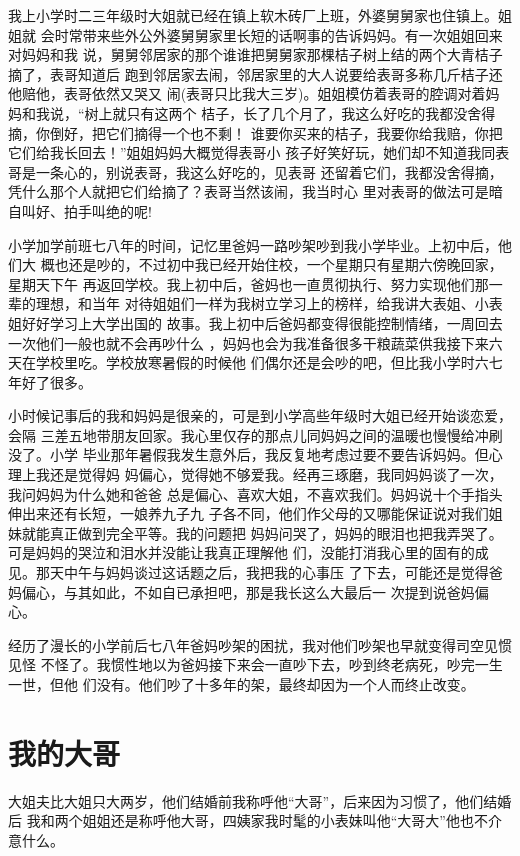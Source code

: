 \documentclass[12pt]{book}
\begin{document}
我上小学时二三年级时大姐就已经在镇上软木砖厂上班，外婆舅舅家也住镇上。姐姐就
会时常带来些外公外婆舅舅家里长短的话啊事的告诉妈妈。有一次姐姐回来对妈妈和我
说，舅舅邻居家的那个谁谁把舅舅家那棵桔子树上结的两个大青桔子摘了，表哥知道后
跑到邻居家去闹，邻居家里的大人说要给表哥多称几斤桔子还他赔他，表哥依然又哭又
闹(表哥只比我大三岁)。姐姐模仿着表哥的腔调对着妈妈和我说，“树上就只有这两个
桔子，长了几个月了，我这么好吃的我都没舍得摘，你倒好，把它们摘得一个也不剩！
谁要你买来的桔子，我要你给我赔，你把它们给我长回去！”姐姐妈妈大概觉得表哥小
孩子好笑好玩，她们却不知道我同表哥是一条心的，别说表哥，我这么好吃的，见表哥
还留着它们，我都没舍得摘，凭什么那个人就把它们给摘了？表哥当然该闹，我当时心
里对表哥的做法可是暗自叫好、拍手叫绝的呢!

小学加学前班七八年的时间，记忆里爸妈一路吵架吵到我小学毕业。上初中后，他们大
概也还是吵的，不过初中我已经开始住校，一个星期只有星期六傍晚回家，星期天下午
再返回学校。我上初中后，爸妈也一直贯彻执行、努力实现他们那一辈的理想，和当年
对待姐姐们一样为我树立学习上的榜样，给我讲大表姐、小表姐好好学习上大学出国的
故事。我上初中后爸妈都变得很能控制情绪，一周回去一次他们一般也就不会再吵什么
，妈妈也会为我准备很多干粮蔬菜供我接下来六天在学校里吃。学校放寒暑假的时候他
们偶尔还是会吵的吧，但比我小学时六七年好了很多。

小时候记事后的我和妈妈是很亲的，可是到小学高些年级时大姐已经开始谈恋爱，会隔
三差五地带朋友回家。我心里仅存的那点儿同妈妈之间的温暖也慢慢给冲刷没了。小学
毕业那年暑假我发生意外后，我反复地考虑过要不要告诉妈妈。但心理上我还是觉得妈
妈偏心，觉得她不够爱我。经再三琢磨，我同妈妈谈了一次，我问妈妈为什么她和爸爸
总是偏心、喜欢大姐，不喜欢我们。妈妈说十个手指头伸出来还有长短，一娘养九子九
子各不同，他们作父母的又哪能保证说对我们姐妹就能真正做到完全平等。我的问题把
妈妈问哭了，妈妈的眼泪也把我弄哭了。可是妈妈的哭泣和泪水并没能让我真正理解他
们，没能打消我心里的固有的成见。那天中午与妈妈谈过这话题之后，我把我的心事压
了下去，可能还是觉得爸妈偏心，与其如此，不如自已承担吧，那是我长这么大最后一
次提到说爸妈偏心。

经历了漫长的小学前后七八年爸妈吵架的困扰，我对他们吵架也早就变得司空见惯见怪
不怪了。我惯性地以为爸妈接下来会一直吵下去，吵到终老病死，吵完一生一世，但他
们没有。他们吵了十多年的架，最终却因为一个人而终止改变。
\section{我的大哥}
\label{sec-9-34}

大姐夫比大姐只大两岁，他们结婚前我称呼他“大哥”，后来因为习惯了，他们结婚后
我和两个姐姐还是称呼他大哥，四姨家我时髦的小表妹叫他“大哥大”他也不介意什么。
\end{document}
